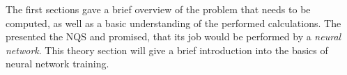 The first sections gave a brief overview of the problem that needs to be computed, as well as a basic understanding of the performed calculations.
The  presented the NQS and promised, that its job would be performed by a \emph{neural network}. 
This theory section will give a brief introduction into the basics of neural network training.

